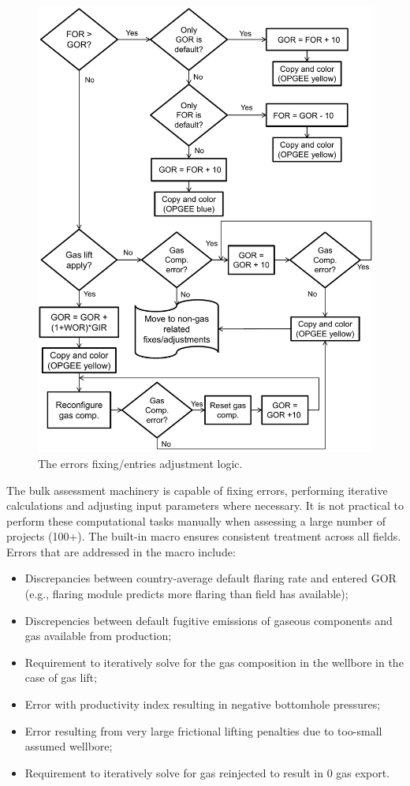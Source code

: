 \documentclass[11pt]{report}
\begin{document}
\begin{figure}[t]
\includegraphics[width=0.8\columnwidth]{images/macro_logic_2a.pdf}
\caption{The errors fixing/entries adjustment logic.}
\label{fig:macro_logic_2}
\end{figure}

The bulk assessment machinery is capable of fixing errors, performing iterative calculations and adjusting input parameters where necessary. It is not practical to perform these computational tasks manually when assessing a large number of projects (100+). The built-in macro ensures consistent treatment across all fields. Errors that are addressed in the macro include:
\begin{itemize}
\item Discrepancies between country-average default flaring rate and entered GOR (e.g., flaring module predicts more flaring than field has available);
\item Discrepencies between default fugitive emissions of gaseous components and gas available from production;
\item Requirement to iteratively solve for the gas composition in the wellbore in the case of gas lift;
\item Error with productivity index resulting in negative bottomhole pressures;
\item Error resulting from very large frictional lifting penalties due to too-small assumed wellbore;
\item Requirement to iteratively solve for gas reinjected to result in 0 gas export.
\end{itemize}
\end{document}
